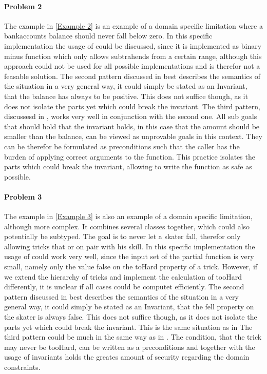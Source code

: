 \paragraph{Problem 2} \label{Problem 2}
The example in \ref{Example 2} is an example of a domain specific limitation where a bankaccounts balance should never fall below zero. In this specific implementation the usage of  could be discussed, since it is implemented as binary minus function which only allows subtrahends from a certain range, although this approach could not be used for all possible implementations and is therefor not a feasable solution. \newline
The second pattern discussed in  best describes the semantics of the situation in a very general way, it could simply be stated as an Invariant, that the balance has always to be positive. This does not suffice though, as it does not isolate the parts yet which could break the invariant. \newline
The third pattern, discussesd in , works very well in conjunction with the second one. All sub goals that should hold that the invariant holds, in this case that the amount should be smaller than the balance, can be viewed as unprovable goals in this context. They can be therefor be formulated as preconditions such that the caller has the burden of applying correct arguments to the function. This practice isolates the parts which could break the invariant, allowing to write the function as safe as possible.

\paragraph{Problem 3}
The example in \ref{Example 3} is also an example of a domain specific limitation, although more complex. It combines several classes together, which could also potentially be subtyped. The goal is to never let a skater fall, therefor only allowing tricks that or on pair with his skill. In this specific implementation the usage of  could work very well, since the input set of the partial function is very small, namely only the value false on the toHard property of a trick. However, if we extend the hierarchy of tricks and implement the calculation of tooHard differently, it is unclear if all cases could be computet efficiently. \newline
The second pattern discussed in  best describes the semantics of the situation in a very general way, it could simply be stated as an Invariant, that the fell property on the skater is always false. This does not suffice though, as it does not isolate the parts yet which could break the invariant. This is the same situation as in  \newline
The third pattern could be much in the same way as in . The condition, that the trick may never be tooHard, can be written as a preconditions and together with the usage of invariants holds the greates amount of security regarding the domain constraints.

